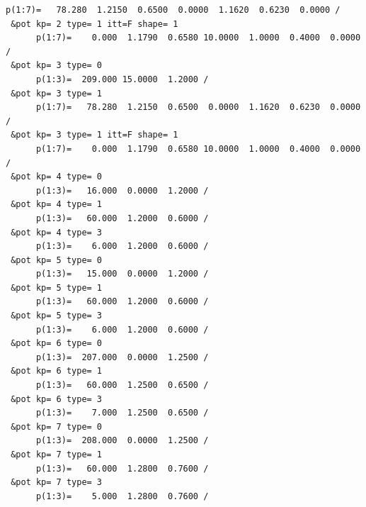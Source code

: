 \documentclass[11pt]{book}
\begin{document}
\begin{small}
\begin{lstlisting}[frame=single]
      p(1:7)=   78.280  1.2150  0.6500  0.0000  1.1620  0.6230  0.0000 /        
 &pot kp= 2 type= 1 itt=F shape= 1                                              
      p(1:7)=    0.000  1.1790  0.6580 10.0000  1.0000  0.4000  0.0000 /        
 &pot kp= 3 type= 0                                                             
      p(1:3)=  209.000 15.0000  1.2000 /                                        
 &pot kp= 3 type= 1                                                             
      p(1:7)=   78.280  1.2150  0.6500  0.0000  1.1620  0.6230  0.0000 /        
 &pot kp= 3 type= 1 itt=F shape= 1                                              
      p(1:7)=    0.000  1.1790  0.6580 10.0000  1.0000  0.4000  0.0000 /        
 &pot kp= 4 type= 0                                                             
      p(1:3)=   16.000  0.0000  1.2000 /                                        
 &pot kp= 4 type= 1                                                             
      p(1:3)=   60.000  1.2000  0.6000 /                                        
 &pot kp= 4 type= 3                                                             
      p(1:3)=    6.000  1.2000  0.6000 /                                        
 &pot kp= 5 type= 0                                                             
      p(1:3)=   15.000  0.0000  1.2000 /                                        
 &pot kp= 5 type= 1                                                             
      p(1:3)=   60.000  1.2000  0.6000 /                                        
 &pot kp= 5 type= 3                                                             
      p(1:3)=    6.000  1.2000  0.6000 /                                        
 &pot kp= 6 type= 0                                                             
      p(1:3)=  207.000  0.0000  1.2500 /                                        
 &pot kp= 6 type= 1                                                             
      p(1:3)=   60.000  1.2500  0.6500 /                                        
 &pot kp= 6 type= 3                                                             
      p(1:3)=    7.000  1.2500  0.6500 /                                        
 &pot kp= 7 type= 0                                                             
      p(1:3)=  208.000  0.0000  1.2500 /                                        
 &pot kp= 7 type= 1                                                             
      p(1:3)=   60.000  1.2800  0.7600 /                                        
 &pot kp= 7 type= 3                                                             
      p(1:3)=    5.000  1.2800  0.7600 /                                        

\end{lstlisting}
\end{small}
\end{document}
